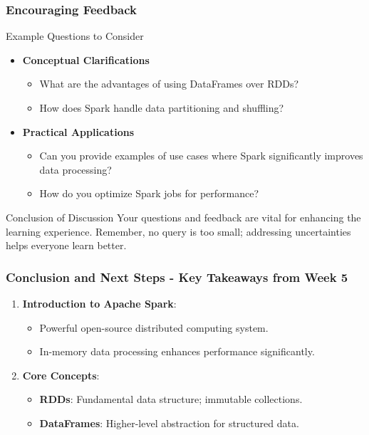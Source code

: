 \documentclass[aspectratio=169]{beamer}
\begin{document}
\begin{frame}[fragile]
  \frametitle{Encouraging Feedback}
  \begin{block}{Example Questions to Consider}
    \begin{itemize}
      \item \textbf{Conceptual Clarifications}
        \begin{itemize}
          \item What are the advantages of using DataFrames over RDDs?
          \item How does Spark handle data partitioning and shuffling?
        \end{itemize}
      \item \textbf{Practical Applications}
        \begin{itemize}
          \item Can you provide examples of use cases where Spark significantly improves data processing?
          \item How do you optimize Spark jobs for performance?
        \end{itemize}
    \end{itemize}
  \end{block}
  
  \begin{block}{Conclusion of Discussion}
    Your questions and feedback are vital for enhancing the learning experience. Remember, no query is too small; 
    addressing uncertainties helps everyone learn better. 
  \end{block}
\end{frame}

\begin{frame}[fragile]
  \frametitle{Conclusion and Next Steps - Key Takeaways from Week 5}
  
  \begin{enumerate}
      \item \textbf{Introduction to Apache Spark}:
      \begin{itemize}
          \item Powerful open-source distributed computing system.
          \item In-memory data processing enhances performance significantly.
      \end{itemize}
      
      \item \textbf{Core Concepts}:
      \begin{itemize}
          \item \textbf{RDDs}: Fundamental data structure; immutable collections.
          \item \textbf{DataFrames}: Higher-level abstraction for structured data.
      \end{itemize}
  \end{enumerate}
\end{frame}
\end{document}
